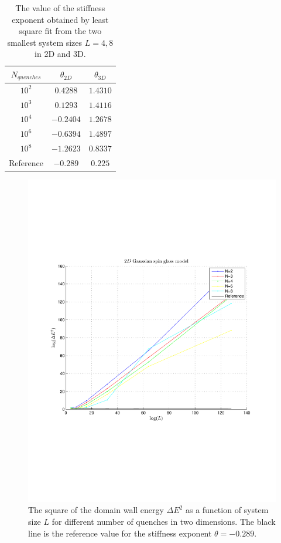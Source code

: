 \documentclass[paper=a4, fontsize=11pt]{scrartcl} %
\numberwithin{equation}{section} %
\numberwithin{figure}{section} %
\numberwithin{table}{section} %
\begin{document}
\begin{table}[h]
\centering
  \begin{tabular}{| c | c | c |}
    \hline
    $N_{quenches}$ & $\theta_{2D}$ & $\theta_{3D}$ \\ \hline
    $10^2$ & $0.4288$ & $1.4310$ \\ \hline
    $10^3$ & $0.1293$ & $1.4116$ \\ \hline
    $10^4$ & $-0.2404$ & $1.2678$ \\ \hline
    $10^6$ & $-0.6394$ & $1.4897$ \\ \hline
    $10^8$ & $-1.2623$ & $0.8337$ \\ \hline
    Reference & $-0.289$ & $0.225$ \\ \hline
  \end{tabular}
  \caption{The value of the stiffness exponent obtained by least square fit from the two smallest system sizes $L=4,8$ in 2D and 3D.}
  \label{tab:stiffness_exponent}
\end{table}

\begin{figure}
\centering
\includegraphics[width=\textwidth]{images/spinglass2D_large.pdf}
\caption{The square of the domain wall energy $\Delta E ^ 2$ as a function of system size $L$ for different number of quenches in two dimensions. The black line is the reference value for the stiffness exponent $\theta=-0.289$.}
\label{fig:E_2D_large}
\end{figure}
\end{document}
